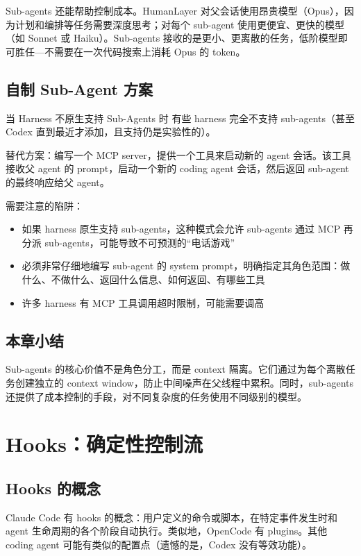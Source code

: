 \documentclass[a4paper]{article}
\begin{document}
Sub-agents 还能帮助控制成本。HumanLayer 对父会话使用昂贵模型（Opus），因为计划和编排等任务需要深度思考；对每个 sub-agent 使用更便宜、更快的模型（如 Sonnet 或 Haiku）。Sub-agents 接收的是更小、更离散的任务，低阶模型即可胜任---不需要在一次代码搜索上消耗 Opus 的 token。

\subsection{自制 Sub-Agent 方案}

\begin{knowledgebox}{当 Harness 不原生支持 Sub-Agents 时}
有些 harness 完全不支持 sub-agents（甚至 Codex 直到最近才添加，且支持仍是实验性的）。

替代方案：编写一个 MCP server，提供一个工具来启动新的 agent 会话。该工具接收父 agent 的 prompt，启动一个新的 coding agent 会话，然后返回 sub-agent 的最终响应给父 agent。

需要注意的陷阱：
\begin{itemize}[leftmargin=1.5em]
    \item 如果 harness 原生支持 sub-agents，这种模式会允许 sub-agents 通过 MCP 再分派 sub-agents，可能导致不可预测的``电话游戏''
    \item 必须非常仔细地编写 sub-agent 的 system prompt，明确指定其角色范围：做什么、不做什么、返回什么信息、如何返回、有哪些工具
    \item 许多 harness 有 MCP 工具调用超时限制，可能需要调高
\end{itemize}
\end{knowledgebox}

\subsection{本章小结}

Sub-agents 的核心价值不是角色分工，而是 context 隔离。它们通过为每个离散任务创建独立的 context window，防止中间噪声在父线程中累积。同时，sub-agents 还提供了成本控制的手段，对不同复杂度的任务使用不同级别的模型。


\section{Hooks：确定性控制流}

\subsection{Hooks 的概念}

Claude Code 有 hooks 的概念：用户定义的命令或脚本，在特定事件发生时和 agent 生命周期的各个阶段自动执行。类似地，OpenCode 有 plugins。其他 coding agent 可能有类似的配置点（遗憾的是，Codex 没有等效功能）。
\end{document}
